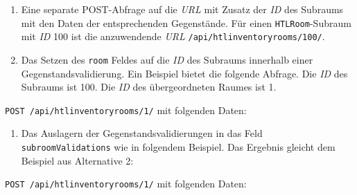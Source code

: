 \begin{enumerate}
\def\labelenumi{\arabic{enumi}.}
\tightlist
\item
  Eine separate POST-Abfrage auf die \emph{URL}
   mit Zusatz der
  \emph{ID}
  des Subraums mit den Daten der entsprechenden Gegenstände. Für einen
  \texttt{HTLRoom}-Subraum mit \emph{ID}
  100 ist die anzuwendende \emph{URL}
  \texttt{/api/htlinventoryrooms/100/}.
\item
  Das Setzen des \texttt{room} Feldes auf die \emph{ID}
  des Subraums innerhalb einer Gegenstandsvalidierung. Ein Beispiel
  bietet die folgende Abfrage. Die \emph{ID}
  des Subraums ist 100. Die \emph{ID}
  des übergeordneten Raumes ist 1.
\end{enumerate}

\texttt{POST\ /api/htlinventoryrooms/1/} mit folgenden Daten:

\begin{Shaded}
\begin{Highlighting}[]
\FunctionTok{\{}
    \FunctionTok{:} \FunctionTok{,}
    \FunctionTok{:} \OtherTok{[}
        \FunctionTok{\{}
            \FunctionTok{:} \FunctionTok{,}
            \FunctionTok{:} 
        \FunctionTok{\}}
    \OtherTok{]}
\FunctionTok{\}}
\end{Highlighting}
\end{Shaded}

\begin{enumerate}
\def\labelenumi{\arabic{enumi}.}
\setcounter{enumi}{2}
\tightlist
\item
  Das Auslagern der Gegenstandsvalidierungen in das Feld
  \texttt{subroomValidations} wie in folgendem Beispiel. Das Ergebnis
  gleicht dem Beispiel aus Alternative 2:
\end{enumerate}

\texttt{POST\ /api/htlinventoryrooms/1/} mit folgenden Daten:

